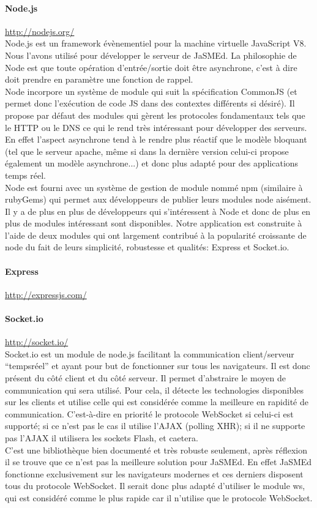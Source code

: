 \documentclass[12pt,a4paper]{article}
\begin{document}
\paragraph{Node.js}\url{http://nodejs.org/}\\
Node.js est un framework évènementiel pour la machine virtuelle JavaScript V8. Nous l’avons utilisé pour développer le serveur de JaSMEd.
La philosophie de Node est que toute opération d’entrée/sortie doit être asynchrone, c’est à dire doit prendre en paramètre une fonction de rappel.\\
Node incorpore un système de module qui suit la spécification CommonJS (et permet donc l'exécution de code JS dans des contextes différents si désiré). Il propose par défaut des modules qui gèrent les protocoles fondamentaux tels que le HTTP ou le DNS ce qui le rend très intéressant pour développer des serveurs. En effet l’aspect asynchrone tend à le rendre plus réactif que le modèle bloquant (tel que le serveur apache, même si dans la dernière version celui-ci propose également un modèle asynchrone...) et donc plus adapté pour des applications temps réel.\\
Node est fourni avec un système de gestion de module nommé npm (similaire à rubyGems) qui permet aux développeurs de publier leurs modules node aisément.\\
Il y a de plus en plus de développeurs qui s’intéressent à Node et donc de plus en plus de modules intéressant sont disponibles. Notre application est construite à l’aide de deux modules qui ont largement contribué à la popularité croissante de node du fait de leurs simplicité, robustesse et qualités: Express et Socket.io.

\paragraph{Express}\url{http://expressjs.com/}

\paragraph{Socket.io}\url{http://socket.io/}\\
Socket.io est un module de node.js facilitant la communication client/serveur “tempsréel” et ayant pour but de fonctionner sur tous les navigateurs. Il est donc présent du côté client et du côté serveur. Il permet d’abstraire le moyen de communication qui sera utilisé. Pour cela, il détecte les technologies disponibles sur les clients et utilise celle qui est considérée comme la meilleure en rapidité de communication. C’est-à-dire en priorité le protocole WebSocket si celui-ci est supporté; si ce n’est pas le cas il utilise l’AJAX (polling XHR); si il ne supporte pas l’AJAX il utilisera les sockets Flash, et caetera.\\
C’est une bibliothèque bien documenté et très robuste seulement, après réflexion il se trouve que ce n’est pas la meilleure solution pour JaSMEd. En effet JaSMEd fonctionne exclusivement sur les navigateurs modernes et ces derniers disposent tous du protocole WebSocket. Il serait donc plus adapté d’utiliser le module ws, qui est considéré comme le plus rapide car il n’utilise que le protocole WebSocket.
\end{document}
